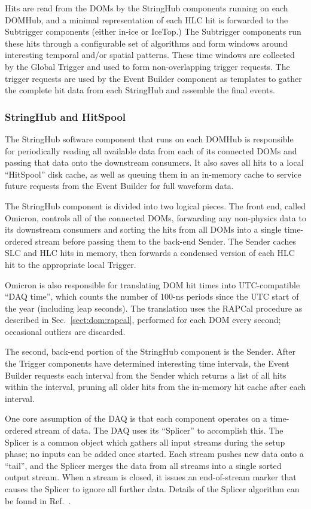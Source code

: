 Hits are read from the DOMs by the
StringHub components running on each DOMHub, and a minimal representation of each HLC hit is
forwarded to the Subtrigger components (either in-ice or IceTop.)
The Subtrigger components run these hits through a
configurable set of algorithms and form windows around interesting temporal
and/or spatial patterns.  These time windows are collected by the
Global Trigger and used to form non-overlapping trigger requests.
The trigger requests are used by the Event Builder component as templates
to gather the complete hit data from each StringHub and assemble the final
events.

\subsubsection{StringHub and HitSpool}
\label{sec:domhub_hitspool}

The StringHub software component that runs on each DOMHub is responsible
for periodically reading all available data from each of its connected DOMs
and passing that data onto the downstream consumers.  It also saves all
hits to a local ``HitSpool'' disk cache, as well as queuing them in an
in-memory cache to service future requests from the Event Builder for full
waveform data.

The StringHub component is divided into two logical pieces.  The front end,
called Omicron, controls all of the connected DOMs, forwarding any
non-physics data to its downstream consumers and sorting the hits from all
DOMs into a single time-ordered stream before passing them to the back-end
Sender.  The Sender caches SLC and HLC hits in memory, then forwards a
condensed version of each HLC hit to the appropriate local Trigger.

Omicron is also responsible for translating DOM hit times into
UTC-compatible ``DAQ time'', which counts the number of 100-ns periods
since the UTC start of the year (including leap seconds).  The translation
uses the RAPCal procedure as described in Sec.~\ref{sect:dom:rapcal},
performed for each DOM every second; occasional outliers are discarded.

The second, back-end portion of the StringHub component is the Sender.  After the
Trigger components have determined interesting time intervals, 
the Event Builder requests each interval from the Sender which returns a list of
all hits within the interval, pruning all older hits from the in-memory hit
cache after each interval.

One core assumption of the DAQ is that each component operates on a
time-ordered stream of data.  The DAQ uses its ``Splicer'' to accomplish
this.  The Splicer is a common object which gathers all input streams
during the setup phase; no inputs can be added once started.  Each stream
pushes new data onto a ``tail'', and the Splicer merges the data from all
streams into a single sorted output stream.  When a stream is closed, it
issues an end-of-stream marker that causes the Splicer to
ignore all further data.  Details of the Splicer algorithm can be found in
Ref.~\cite{vlvnt13_trigger}.  

